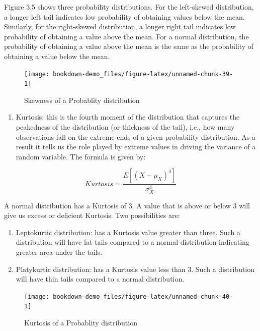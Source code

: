 \documentclass[
]{book}
\providecommand{\tightlist}{%
  \setlength{\itemsep}{0pt}\setlength{\parskip}{0pt}}
\theoremstyle{definition}
\theoremstyle{definition}
\theoremstyle{definition}
\theoremstyle{definition}
\theoremstyle{remark}
\begin{document}
Figure 3.5 shows three probability distributions. For the left-skewed distribution, a longer left tail indicates low probability of obtaining values below the mean. Similarly, for the right-skewed distribution, a longer right tail indicates low probability of obtaining a value above the mean. For a normal distribution, the probability of obtaining a value above the mean is the same as the probability of obtaining a value below the mean.

\begin{figure}

{\centering \texttt{[image: bookdown-demo\_files/figure-latex/unnamed-chunk-39-1]} 

}

\caption{Skewness of a Probablity distribution}\label{fig:unnamed-chunk-39}
\end{figure}

\begin{enumerate}
\def\labelenumi{\arabic{enumi}.}
\setcounter{enumi}{1}
\tightlist
\item
  Kurtosis: this is the fourth moment of the distribution that captures the peakedness of the distribution (or thickness of the tail), i.e., how many observations fall on the extreme ends of a given probability distribution. As a result it tells us the role played by extreme values in driving the variance of a random variable. The formula is given by:
\end{enumerate}

\[Kurtosis=\frac{E[(X-\mu_X)^4]}{\sigma^4_X}\]

A normal distribution has a Kurtosis of 3. A value that is above or below 3 will give us excess or deficient Kurtosis. Two possibilities are:

\begin{enumerate}
\def\labelenumi{\alph{enumi}.}
\item
  Leptokurtic distribution: has a Kurtosis value greater than three. Such a distribution will have fat tails compared to a normal distribution indicating greater area under the tails.
\item
  Platykurtic distribution: has a Kurtosis value less than 3. Such a distribution will have thin tails compared to a normal distribution.
\end{enumerate}

\begin{figure}

{\centering \texttt{[image: bookdown-demo\_files/figure-latex/unnamed-chunk-40-1]} 

}

\caption{Kurtosis of a Probablity distribution}\label{fig:unnamed-chunk-40}
\end{figure}
\end{document}
